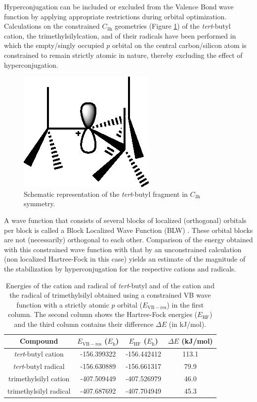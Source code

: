 Hyperconjugation can be included or excluded from the Valence Bond wave function by applying appropriate restrictions during orbital optimization.  Calculations on the constrained $C_\mathrm{3h}$ geometries (Figure \ref{ch3.fig.c3h}) of the \textit{tert}-butyl cation, the trimethylsilylcation, and of their radicals have been performed in which the empty/singly occupied $p$ orbital on the central carbon/silicon atom is constrained to remain strictly atomic in nature, thereby excluding the effect of hyperconjugation.
\begin{figure}[ht]
\center
\includegraphics{dissociation/figures/c3h.eps}
\caption{Schematic representation of the \textit{tert}-butyl fragment in $C_\mathrm{3h}$ symmetry.}
\label{ch3.fig.c3h}
\end{figure}
A wave function that consists of several blocks of localized (orthogonal) orbitals per block is called a Block Localized Wave Function (BLW) \cite{blw}. These orbital blocks are not (necessarily) orthogonal to each other. Comparison of the energy obtained with this constrained wave function with that by an unconstrained calculation  (non localized Hartree-Fock in this case) yields an estimate of the magnitude of the stabilization by hyperconjugation for the respective cations and radicals. 

\begin{table}[htp]
\center
\caption{Energies of the cation and radical of \textit{tert}-butyl and of the cation and the radical of trimethylsilyl obtained using a constrained VB wave function with a strictly atomic $p$ orbital ($E_\mathrm{VB-res}$) in the first column. The second column shows the Hartree-Fock energies ($E_\mathrm{HF}$) and the third column contains their difference $\Delta E$ (in kJ/mol).}
\label{ch3.tab.hyp}
\begin{tabular}{|c|c|c|c|}
\hline
\textbf{Compound} & $E_\mathrm{VB-res}$ ($E_{\mathrm{h}}$) &$E_\mathrm{HF}$ ($E_{\mathrm{h}}$)& $\Delta E$ (kJ/mol)  \\
\hline
\textit{tert}-butyl cation & -156.399322 &-156.442412&113.1  \\
\textit{tert}-butyl radical & -156.630889 &-156.661317&79.9 \\
trimethylsilyl cation & -407.509449&-407.526979&46.0 \\
trimethylsilyl radical &-407.687692&-407.704949&45.3 \\
\hline
\end{tabular}
\end{table}

